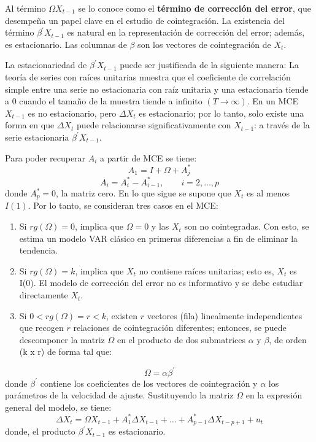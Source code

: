 Al t\'{e}rmino $\Omega X_{t-1}$ se lo conoce como el \textbf{t\'{e}rmino de correcci\'{o}n del error}, que desempe\~{n}a un papel clave en el estudio de cointegraci\'{o}n. La existencia del t\'{e}rmino $\beta^{'}X_{t-1}$ es natural en la representaci\'{o}n de correcci\'{o}n del error; adem\'{a}s, es estacionario. Las columnas de $\beta$ son los vectores de cointegraci\'{o}n de $X_{t}$.\newline

La estacionariedad de $\beta^{'} X_{t-1}$ puede ser justificada de la siguiente manera: La teor\'{i}a de series con ra\'{i}ces unitarias muestra que el coeficiente de correlaci\'{o}n simple entre una serie no estacionaria con ra\'{i}z unitaria y una estacionaria tiende a 0 cuando el tama\~{n}o de la muestra tiende a infinito $(T\to \infty )$. En un MCE $X_{t-1}$ es no estacionario, pero $\Delta X_{t}$ es estacionario; por lo tanto, solo existe una forma en que $\Delta X_{t}$ puede relacionarse significativamente con $X_{t-1}$: a trav\'{e}s de la serie estacionaria $\beta^{'} X_{t-1}$.\newline

Para poder recuperar $A_{i}$ a partir de MCE se tiene:
\[
A_{1}=I+\Omega +A_{j}^{\ast }
\]
\[
A_{i}=A_{i}^{\ast}-A_{i-1}^{\ast },\qquad i=2,\ldots ,p
\]
donde $A_{p}^{\ast}=0$, la matriz cero. En lo que sigue se supone que $X_{t}$ es al menos $I(1)$. Por lo tanto, se consideran tres casos en el MCE:

\begin{enumerate}
      \item Si $rg(\Omega)=0$, implica que $\Omega=0$ y las $X_{t}$ son no cointegradas. Con esto, se estima un modelo VAR cl\'{a}sico en primeras diferencias a fin de eliminar la tendencia.
      \item Si $rg(\Omega)=k$, implica que $X_{t}$ no contiene ra\'{i}ces unitarias; esto es, $X_{t}$ es I(0). El modelo de correcci\'{o}n del error no es informativo y se debe estudiar directamente $X_{t}$. 
      \item Si $0<rg(\Omega)=r < k$, existen $r$ vectores (fila) linealmente independientes que recogen $r$ relaciones de cointegraci\'{o}n diferentes; entonces, se puede descomponer la matriz $\Omega$ en el producto de dos submatrices $\alpha$ y $\beta$, de orden (k x r) de forma tal que:
\end{enumerate}

\[
\Omega =\alpha\beta^{'}
\]
donde $\beta^{'}$ contiene los coeficientes de los vectores de cointegraci\'{o}n y $\alpha$ los par\'{a}metros de la velocidad de ajuste. Sustituyendo la matriz $\Omega$ en la expresi\'{o}n general del modelo, se tiene:
\[
\Delta X_{t}=\Omega X_{t-1}+A_{1}^{\ast}\Delta X_{t-1}+\ldots +A_{p-1}^{\ast}\Delta X_{t-p+1}+u_{t}
\]
donde, el producto $\beta^{'} X_{t-1}$ es estacionario.

